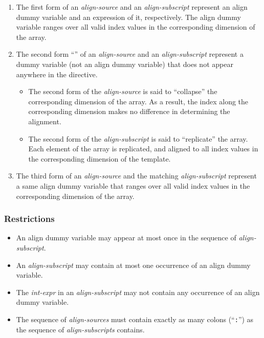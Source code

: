 \begin{enumerate}
\item The first form of an {\it align-source} and an {\it
      align-subscript} represent an align dummy variable and an
      expression of it, respectively. The align dummy variable ranges
      over all valid index values in the corresponding dimension of the
      array.
\item The second form ``{\tt *}'' of an {\it align-source} and an {\it
      align-subscript} represent a dummy variable (not an align dummy
      variable) that does not appear anywhere in the directive.
      \begin{itemize} 
       \item The second form of the {\it align-source} is said to
	     ``collapse'' the corresponding dimension of the array. As a
	     result, the index along the corresponding dimension makes
	     no difference in determining the alignment.
       \item The second form of the {\it align-subscript} is said to
	     ``replicate'' the array. Each element of the array is
	     replicated, and aligned to all index values in the
	     corresponding dimension of the template.
      \end{itemize}
\item The third form of an {\it align-source} and the matching {\it
      align-subscript} represent a same align dummy variable that
      ranges over all valid index values in the corresponding dimension
      of the array.


\end{enumerate}

\subsubsection*{Restrictions}

\begin{itemize}
\item An align dummy variable may appear at most once in the sequence of
      {\it align-subscript}.
\item An {\it align-subscript} may contain at most one occurrence of an
      align dummy variable.
\item The {\it int-expr} in an {\it align-subscript} may not contain any
      occurrence of an align dummy variable.
\item The sequence of {\it align-sources} must contain exactly as many
      colons (``{\tt :}'') as the sequence of {\it align-subscripts}
      contains.

\end{itemize}

